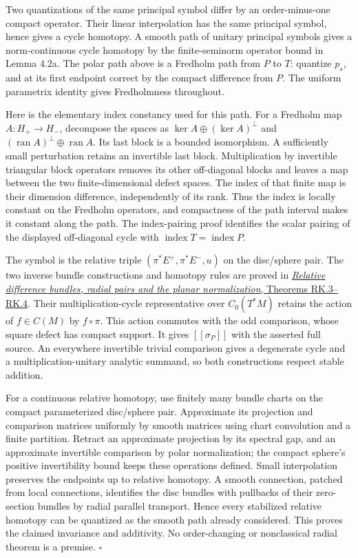 \documentclass[
  11pt,
]{article}
\begin{document}
Two quantizations of the same principal symbol differ by an
order-minus-one compact operator. Their linear interpolation has the
same principal symbol, hence gives a cycle homotopy. A smooth path of
unitary principal symbols gives a norm-continuous cycle homotopy by the
finite-seminorm operator bound in Lemma 4.2a. The polar path above is a
Fredholm path from \(P\) to \(T\): quantize \(p_s\), and at its first
endpoint correct by the compact difference from \(P\). The uniform
parametrix identity gives Fredholmness throughout.

Here is the elementary index constancy used for this path. For a
Fredholm map \(A:H_+\to H_-\), decompose the spaces as
\(\ker A\oplus(\ker A)^\perp\) and
\((\operatorname{ran}A)^\perp\oplus\operatorname{ran}A\). Its last block
is a bounded isomorphism. A sufficiently small perturbation retains an
invertible last block. Multiplication by invertible triangular block
operators removes its other off-diagonal blocks and leaves a map between
the two finite-dimensional defect spaces. The index of that finite map
is their dimension difference, independently of its rank. Thus the index
is locally constant on the Fredholm operators, and compactness of the
path interval makes it constant along the path. The index-pairing proof
identifies the scalar pairing of the displayed off-diagonal cycle with
\(\operatorname{index}T=\operatorname{index}P\).

The symbol is the relative triple \((\pi^*E^+,\pi^*E^-,u)\) on the
disc/sphere pair. The two inverse bundle constructions and homotopy
rules are proved in
\href{supporting/relative-k-foundations/relative-k-foundations.html\#rk-source-scope}{\emph{Relative
difference bundles, radial pairs and the planar normalization}, Theorems
RK.3--RK.4}. Their multiplication-cycle representative over
\(C_0(T^*M)\) retains the action of \(f\in C(M)\) by \(f\circ\pi\). This
action commutes with the odd comparison, whose square defect has compact
support. It gives \([\![\sigma_P]\!]\) with the asserted full source. An
everywhere invertible trivial comparison gives a degenerate cycle and a
multiplication-unitary analytic summand, so both constructions respect
stable addition.

For a continuous relative homotopy, use finitely many bundle charts on
the compact parameterized disc/sphere pair. Approximate its projection
and comparison matrices uniformly by smooth matrices using chart
convolution and a finite partition. Retract an approximate projection by
its spectral gap, and an approximate invertible comparison by polar
normalization; the compact sphere's positive invertibility bound keeps
these operations defined. Small interpolation preserves the endpoints up
to relative homotopy. A smooth connection, patched from local
connections, identifies the disc bundles with pullbacks of their
zero-section bundles by radial parallel transport. Hence every
stabilized relative homotopy can be quantized as the smooth path already
considered. This proves the claimed invariance and additivity. No
order-changing or nonclassical radial theorem is a premise. \(\square\)
\end{document}
